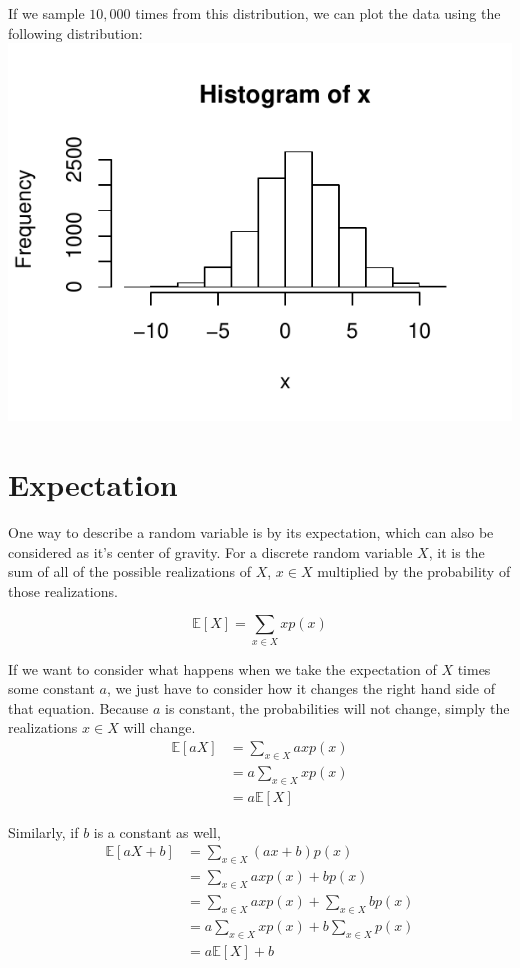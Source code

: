 \documentclass{article} %
\newcommand{\E}{\mathbb{E}}    %
\begin{document}
If we sample $10,000$ times from this distribution, we can plot the data using the following distribution:
\includegraphics[scale=1]{normal.pdf}

\section{Expectation}

One way to describe a random variable is by its expectation, which can also be considered as it's center of gravity. For a discrete random variable $X$, it is the sum of all of the possible realizations of $X$, $x \in X$ multiplied by the probability of those realizations.

\[
\E[X] = \sum_{x \in X} x p(x)
\]

If we want to consider what happens when we take the expectation of $X$ times some constant $a$, we just have to consider how it changes the right hand side of that equation. Because $a$ is constant, the probabilities will not change, simply the realizations $x\in X$ will change.
\begin{align*}
	\E[aX] &= \sum_{x \in X} ax p(x) \\
	&= a \sum_{x \in X} x p(x) \\
	&= a \E[X]
\end{align*}

Similarly, if $b$ is a constant as well,
\begin{align*}
	\E[aX + b] &= \sum_{x \in X} (ax + b) p(x) \\
	&= \sum_{x \in X} ax p(x) + b p(x) \\
	&= \sum_{x \in X} ax p(x) + \sum_{x \in X} b p(x) \\
	&= a \sum_{x \in X} x p(x) + b \sum_{x \in X} p(x) \\
	&= a \E[X] + b
\end{align*}
\end{document}
